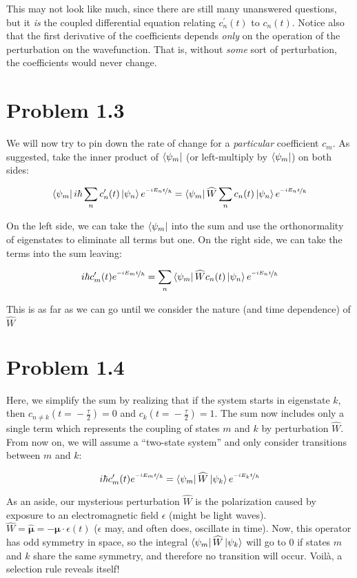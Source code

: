 \documentclass[12pt, openany, letterpaper]{memoir}
\begin{document}
This may not look like much, since there are still many unanswered questions, but it \emph{is} the coupled differential equation relating $c^\prime_n(t)$ to $c_n(t)$. Notice also that the first derivative of the coefficients depends \emph{only} on the operation of the perturbation on the wavefunction. That is, without \emph{some} sort of perturbation, the coefficients would never change. 

\section*{Problem 1.3}
We will now try to pin down the rate of change for a \emph{particular} coefficient $c_m$. As suggested, take the inner product of $\left< \psi_m \right|$ (or left-multiply by $\left< \psi_m \right|$) on both sides:

$$
\left< \psi_m \right|i\hbar\sum_n c^\prime_n(t)\left| \psi_n \right>e^{\nicefrac{-iE_nt}{\hbar}} =  \left< \psi_m \right|\widehat{W}\sum_n c_n(t)\left| \psi_n \right>e^{\nicefrac{-iE_nt}{\hbar}}
$$

On the left side, we can take the $\left< \psi_m \right|$ into the sum and use the orthonormality of eigenstates to eliminate all terms but one. On the right side, we can take the terms into the sum leaving:

$$
i\hbar c^\prime_m(t)e^{\nicefrac{-iE_mt}{\hbar}} = \sum_n\left< \psi_m \right|\widehat{W} c_n(t)\left| \psi_n \right>e^{\nicefrac{-iE_nt}{\hbar}}
$$

This is as far as we can go until we consider the nature (and time dependence) of $\widehat{W}$

\section*{Problem 1.4}
Here, we simplify the sum by realizing that if the system starts in eigenstate $k$, then $c_{n\neq k}(t\!=\!-\frac{\tau}{2}) = 0$ and $c_{k}(t\!=\!-\frac{\tau}{2}) = 1$. The sum now includes only a single term which represents the coupling of states $m$ and $k$ by perturbation $\widehat{W}$. From now on, we will assume a ``two-state system'' and only consider transitions between $m$ and $k$:

$$
i\hbar c^\prime_m(t)e^{\nicefrac{-iE_mt}{\hbar}} = \left< \psi_m \right|\widehat{W} \left| \psi_k \right>e^{\nicefrac{-iE_kt}{\hbar}}
$$

As an aside, our mysterious perturbation $\widehat{W}$ is the polarization caused by exposure to an electromagnetic field $\epsilon$ (might be light waves). $\widehat{W} = \hat{\mathbf{\mu}}=-\mathbf{\mu}\cdot\epsilon(t)$ ($\epsilon$ may, and often does, oscillate in time). Now, this operator has odd symmetry in space, so the integral $\left< \psi_m \right|\widehat{W} \left| \psi_k \right>$ will go to $0$ if states $m$ and $k$ share the same symmetry, and therefore no transition will occur. Voil\`a, a selection rule reveals itself!
\end{document}

